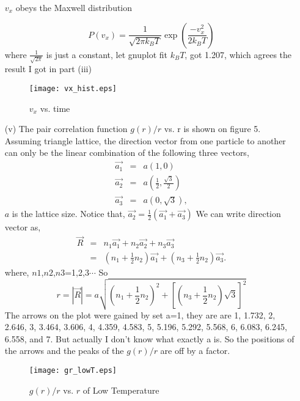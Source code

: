 \documentclass{article}
\begin{document}
\begin{enumerate}
$v_x$ obeys the Maxwell distribution

\[P(v_x)=\frac{1}{\sqrt{2\pi k_BT}}\exp{\left(\frac{-v_x^2}{2k_BT}\right)}\]
where $\frac{1}{\sqrt{2\pi}}$ is just a constant, let gnuplot fit $k_BT$, got 1.207, which agrees the result I got in part (iii)

\begin{figure}[ht]
   \begin{center}
   {\texttt{[image: vx\_hist.eps]}}
   \caption{$v_x$ vs. time}
   \end{center}
  \end{figure}
  
\vskip 1cm
\item[(v)]
The pair correlation function $g(r)/r$ vs. r is shown on figure 5.
Assuming triangle lattice, the direction vector from one particle to another can only be the linear combination of the following three vectors,
	\begin{eqnarray}
		\vec{a_1} &=& a\left( 1,0 \right)	 \nonumber\\
		\vec{a_2} &=& a\left( \frac{1}{2},\frac{\sqrt{3}}{2} \right)	 \nonumber\\
		\vec{a_3} &=& a\left( 0,\sqrt{3} \right),
	\end{eqnarray}
$a$ is the lattice size.
Notice that, $\vec{a_2} = \frac{1}{2}\left(\vec{a_1}+\vec{a_3}\right)$
We can write direction vector as,
\begin{eqnarray}
\vec{R} &=& n_1\vec{a_1}+n_2\vec{a_2}+n_3\vec{a_3}\nonumber\\
        &=& \left(n_1+\frac{1}{2}n_2\right)\vec{a_1}+\left(n_3+\frac{1}{2}n_2\right)\vec{a_3}.
\end{eqnarray}
where, $n1$,$n2$,$n3$=1,2,3$\cdots$
So
\[r=|\vec{R}|=a\sqrt{\left(n_1+\frac{1}{2}n_2\right)^2+\left[\left(n_3+\frac{1}{2}n_2\right)\sqrt{3}\right]^2}\]
The arrows on the plot were gained by set a=1, they are are 1, 1.732, 2, 2.646, 3, 3.464, 3.606, 4, 4.359, 4.583, 5, 5.196, 5.292, 5.568, 6, 6.083, 6.245, 6.558, and 7.  But actually I don't know what exactly a is.  So the positions of the arrows and the peaks of the $g(r)/r$ are off by a factor.
\begin{figure}[ht]
   \begin{center}
   {\texttt{[image: gr\_lowT.eps]}}
   \caption{$g(r)/r$ vs. $r$ of Low Temperature}
   \end{center}
  \end{figure}


\end{enumerate}
\end{document}

